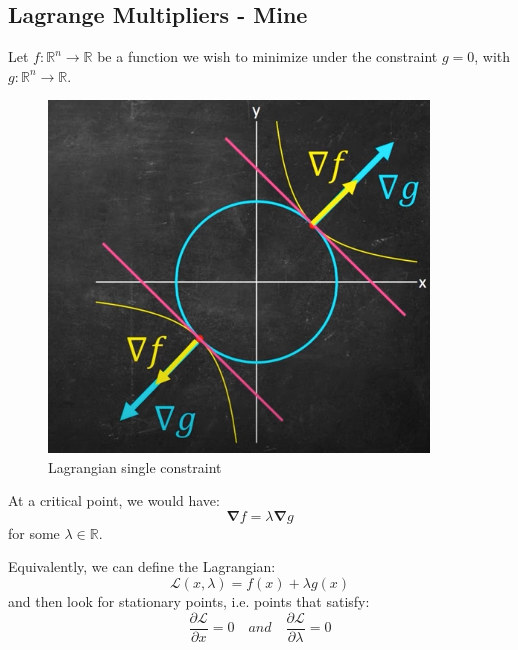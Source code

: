 \documentclass{article}
\begin{document}
\subsection{Lagrange Multipliers - Mine}
\begin{theorem}
Let $f: \mathbb{R}^{n} \to \mathbb{R}$ be a function we wish to minimize under the constraint $g =0$, with $g: \mathbb{R}^{n} \to \mathbb{R}$.  
\begin{figure}[H] \centering \includegraphics[height=0.2\textheight,width=0.9\textwidth,keepaspectratio]{lagrangianSingleConstraint} \caption{Lagrangian single constraint} \label{fig:lagrangianSingleConstraint} \end{figure}
At a critical point, we would have:
\[
  \bm{\nabla}f = \lambda \bm{\nabla}g
\]
for some $\lambda \in \mathbb{R}$. 

Equivalently, we can define the Lagrangian:
\[
  \mathcal{L}(x,\lambda) = f(x) + \lambda g(x)
\]
and then look for stationary points, i.e. points that satisfy:
\[
  \frac{\partial \mathcal{L}}{\partial x} = 0 \quad and \quad \frac{\partial \mathcal{L}}{\partial \lambda} = 0  
\]

\end{theorem}
\end{document}
